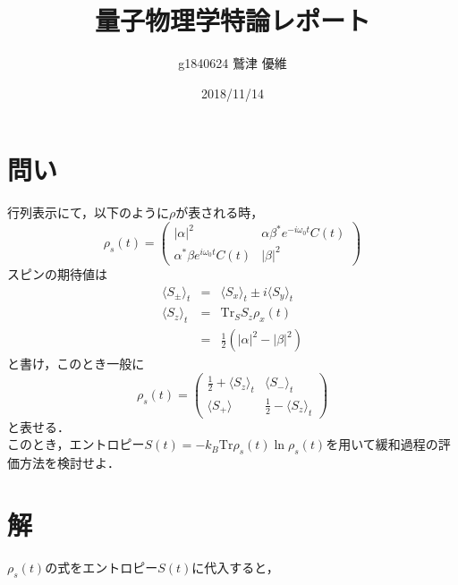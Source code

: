 \documentclass[10pt]{ujarticle}
\title{量子物理学特論レポート}
\author{g1840624 鷲津 優維}
\date{2018/11/14}
\begin{document}
\maketitle
\section{問い}
行列表示にて，以下のように$\rho$が表される時，
\[
\rho_s(t) = \left(
\begin{array}{cc}
|\alpha|^2 & \alpha \beta^{\ast} e^{-i\omega_0 t} C(t) \\
\alpha^{\ast} \beta e^{i\omega_0 t} C(t) & |\beta|^2
\end{array}
\right)
\]
スピンの期待値は
\begin{eqnarray*}
\langle S_\pm \rangle_t &=& \langle S_x \rangle_t \pm i \langle S_y \rangle_t \\
\langle S_z \rangle_t &=& \mathrm{Tr}_S S_z \rho_x(t)\\
&=& \frac{1}{2} (|\alpha|^2 - |\beta|^2)
\end{eqnarray*}
と書け，このとき一般に
\[
\rho_s(t) = \left(
\begin{array}{cc}
\frac{1}{2} + \langle S_z \rangle_t & \langle S_- \rangle_t \\
\langle S_+ \rangle & \frac{1}{2} - \langle S_z \rangle_t
\end{array}
\right)
\]
と表せる．\\
このとき，エントロピー$S(t) = -k_B \mathrm{Tr} \rho_s (t) \ln \rho_s(t)$を用いて緩和過程の評価方法を検討せよ．

\section{解}
$\rho_s(t)$の式をエントロピー$S(t)$に代入すると，
\end{document}
